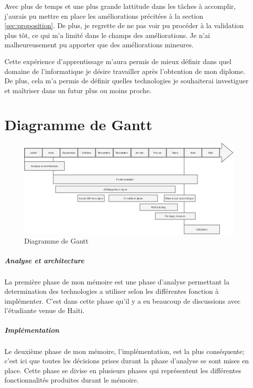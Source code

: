 \documentclass{EPL-master-thesis-covers-FR}
\begin{document}
		Avec plus de temps et une plus grande lattitude dans les tâches à accomplir, j'aurais pu mettre en place les améliorations précitées à la section \ref{sec:proposition}. De plus, je regrette de ne pas voir pu procéder à la validation plus tôt, ce qui m'a limité dans le champs des améliorations. Je n'ai malheureusement pu apporter que des améliorations mineures.

		Cette expérience d'apprentissage m'aura permis de mieux définir dans quel domaine de l'informatique je désire travailler après l'obtention de mon diplome. De plus, cela m'a permis de définir quelles technologies je souhaiterai investiguer et maîtriser dans un futur plus ou moins proche.
		
		

	
	
	
	
	\appendix
	
		\chapter{Diagramme de Gantt}
		
			\begin{figure}[H]
					\centering
					\includegraphics[width=1\textwidth]{images/Gantt}
					\caption{Diagramme de Gantt}
					\label{fig:Gantt}
			\end{figure}
				

				
			\paragraph*{Analyse et architecture}
			La première phase de mon mémoire est une phase d'analyse permettant la determination des technologies a utiliser selon les différentes fonction à implémenter. C'est dans cette phase qu'il y a eu beaucoup de discussions avec l'étudiante venue de Haïti.
		
			\paragraph*{Implémentation} 
			Le deuxième phase de mon mémoire, l'implémentation, est la plus conséquente; c'est ici que toutes les décisions prises durant la phase d'analyse se sont mises en place. Cette phase se divise en plusieurs phases qui représentent les différentes fonctionnalités produites durant le mémoire. 
			
\end{document}

